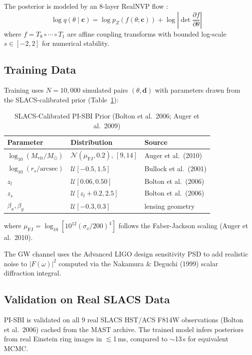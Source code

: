 \documentclass[journal]{IEEEtran}
\begin{document}
The posterior is modeled by an 8-layer RealNVP flow \citep{Dinh2017}:
\begin{equation}
\log q(\theta \mid \mathbf{c}) = \log p_Z(f(\theta;\mathbf{c})) + \log\left|\det\frac{\partial f}{\partial\theta}\right|
\label{eq:flow_log_prob}
\end{equation}
where $f = T_8 \circ \cdots \circ T_1$ are affine coupling transforms with 
bounded log-scale $s \in [-2, 2]$ for numerical stability.

\subsection{Training Data}
Training uses $N=10{,}000$ simulated pairs $(\theta, \mathbf{d})$ with
parameters drawn from the SLACS-calibrated prior (Table~\ref{tab:prior}):
\begin{table}[h]
\centering
\caption{SLACS-Calibrated PI-SBI Prior (Bolton et al.\ 2006; Auger et al.\ 2009)}
\label{tab:prior}
\begin{tabular}{lll}
\hline
Parameter & Distribution & Source \\
\hline
$\log_{10}(M_\mathrm{vir}/M_\odot)$ & $\mathcal{N}(\mu_\mathrm{FJ}, 0.2)$, $[9, 14]$ & Auger et al.\ (2010) \\
$\log_{10}(r_s/\text{arcsec})$ & $\mathcal{U}[-0.5, 1.5]$ & Bullock et al.\ (2001) \\
$z_l$ & $\mathcal{U}[0.06, 0.50]$ & Bolton et al.\ (2006) \\
$z_s$ & $\mathcal{U}[z_l+0.2, 2.5]$ & Bolton et al.\ (2006) \\
$\beta_x, \beta_y$ & $\mathcal{U}[-0.3, 0.3]$ & lensing geometry \\
\hline
\end{tabular}
\end{table}
where $\mu_\mathrm{FJ} = \log_{10}[10^{12}(\sigma_v/200)^4]$ follows the
Faber-Jackson scaling (Auger et al.\ 2010).

The GW channel uses the Advanced LIGO design sensitivity PSD \citep{Aasi2015}
to add realistic noise to $|F(\omega)|^2$ computed via the Nakamura \& Deguchi
(1999) scalar diffraction integral.

\subsection{Validation on Real SLACS Data}
PI-SBI is validated on all 9 real SLACS HST/ACS F814W observations
(Bolton et al.\ 2006) cached from the MAST archive. The trained model
infers posteriors from real Einstein ring images in $\lesssim$1\,ms,
compared to $\sim$13\,s for equivalent MCMC.
\end{document}
